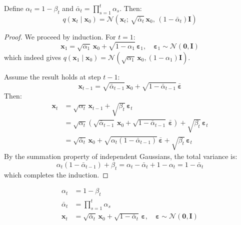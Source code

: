 \begin{theorem}
\label{thm:closed-form}
Define $\alpha_t = 1 - \beta_t$ and $\bar{\alpha}_t = \prod_{s=1}^{t} \alpha_s$.
Then:
\begin{equation}
q(\mathbf{x}_t \mid \mathbf{x}_0) = \mathcal{N}\!\left(\mathbf{x}_t;\, \sqrt{\bar{\alpha}_t}\,\mathbf{x}_0,\, (1 - \bar{\alpha}_t)\mathbf{I}\right)
\label{eq:closed-form}
\end{equation}
\end{theorem}

\begin{proof}
We proceed by induction. For $t = 1$:
\[
\mathbf{x}_1 = \sqrt{\alpha_1}\,\mathbf{x}_0 + \sqrt{1 - \alpha_1}\,\boldsymbol{\varepsilon}_1, \quad \boldsymbol{\varepsilon}_1 \sim \mathcal{N}(\mathbf{0}, \mathbf{I})
\]
which indeed gives $q(\mathbf{x}_1 \mid \mathbf{x}_0) = \mathcal{N}(\sqrt{\alpha_1}\,\mathbf{x}_0, (1 - \alpha_1)\mathbf{I})$.

Assume the result holds at step $t-1$:
\[
\mathbf{x}_{t-1} = \sqrt{\bar{\alpha}_{t-1}}\,\mathbf{x}_0 + \sqrt{1 - \bar{\alpha}_{t-1}}\,\bar{\boldsymbol{\varepsilon}}
\]
Then:
\begin{align}
\mathbf{x}_t &= \sqrt{\alpha_t}\,\mathbf{x}_{t-1} + \sqrt{\beta_t}\,\boldsymbol{\varepsilon}_t \\
&= \sqrt{\alpha_t}\left(\sqrt{\bar{\alpha}_{t-1}}\,\mathbf{x}_0 + \sqrt{1 - \bar{\alpha}_{t-1}}\,\bar{\boldsymbol{\varepsilon}}\right) + \sqrt{\beta_t}\,\boldsymbol{\varepsilon}_t \\
&= \sqrt{\bar{\alpha}_t}\,\mathbf{x}_0 + \sqrt{\alpha_t(1 - \bar{\alpha}_{t-1})}\,\bar{\boldsymbol{\varepsilon}} + \sqrt{\beta_t}\,\boldsymbol{\varepsilon}_t
\end{align}
By the summation property of independent Gaussians, the total variance
is:
\[
\alpha_t(1 - \bar{\alpha}_{t-1}) + \beta_t = \alpha_t - \bar{\alpha}_t + 1 - \alpha_t = 1 - \bar{\alpha}_t
\]
which completes the induction.
\end{proof}

\begin{keyformulas}[title=\textbf{Key Equations of the Forward Process}]
\begin{align}
\alpha_t &= 1 - \beta_t \\
\bar{\alpha}_t &= \prod_{s=1}^{t} \alpha_s \\
\mathbf{x}_t &= \sqrt{\bar{\alpha}_t}\,\mathbf{x}_0 + \sqrt{1 - \bar{\alpha}_t}\,\boldsymbol{\varepsilon}, \quad \boldsymbol{\varepsilon} \sim \mathcal{N}(\mathbf{0}, \mathbf{I})
\end{align}
\end{keyformulas}

